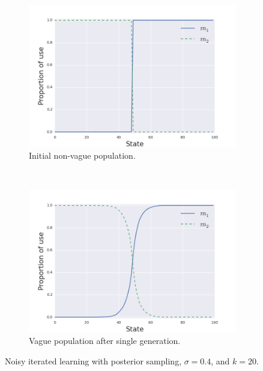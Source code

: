 \documentclass[10pt,a4paper]{article}
\begin{document}
\begin{figure}[ht]
  \centering
  \begin{subfigure}[b]{0.45\textwidth}
    \includegraphics[scale=0.4]{../code/plots/vag-gen0.png}
    \caption{Initial non-vague population.}
    \label{fig:vaga}
  \end{subfigure}
  ~
   \begin{subfigure}[b]{0.45\textwidth}
    \includegraphics[scale=0.4]{../code/plots/vag-gen1.png}
    \caption{Vague population after single generation.}
    \label{fig:vagb}

  \end{subfigure}
  \caption{Noisy iterated learning with posterior sampling, $\sigma = 0.4$, and $k =
    20$.}
  \label{fig:vag}
\end{figure}
 
\end{document}
